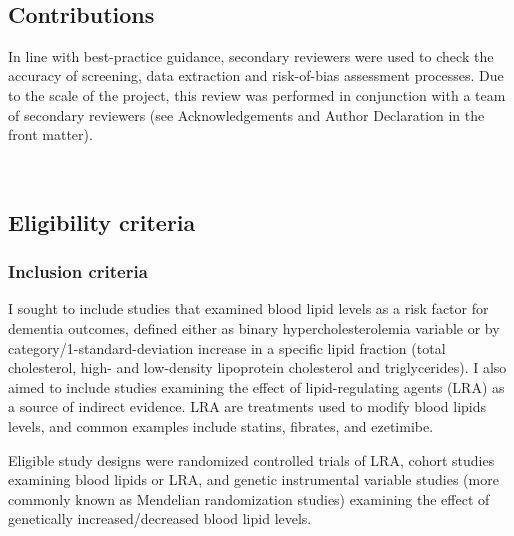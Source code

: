 \documentclass[a4paper, twoside]{templates/ociamthesis}
\begin{document}
~

\hypertarget{contributions}{%
\subsection{Contributions}\label{contributions}}

In line with best-practice guidance, secondary reviewers were used to check the accuracy of screening, data extraction and risk-of-bias assessment processes. Due to the scale of the project, this review was performed in conjunction with a team of secondary reviewers (see Acknowledgements and Author Declaration in the front matter).

~

\hypertarget{eligibility-criteria}{%
\subsection{Eligibility criteria}\label{eligibility-criteria}}

\hypertarget{inclusion-criteria}{%
\subsubsection{Inclusion criteria}\label{inclusion-criteria}}

I sought to include studies that examined blood lipid levels as a risk factor for dementia outcomes, defined either as binary hypercholesterolemia variable or by category/1-standard-deviation increase in a specific lipid fraction (total cholesterol, high- and low-density lipoprotein cholesterol and triglycerides). I also aimed to include studies examining the effect of lipid-regulating agents (LRA) as a source of indirect evidence. LRA are treatments used to modify blood lipids levels, and common examples include statins, fibrates, and ezetimibe.

Eligible study designs were randomized controlled trials of LRA, cohort studies examining blood lipids or LRA, and genetic instrumental variable studies (more commonly known as Mendelian randomization studies) examining the effect of genetically increased/decreased blood lipid levels.
\end{document}
